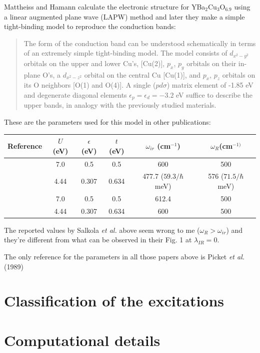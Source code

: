 Mattheiss and Hamann\cite{Mattheiss1987} calculate the electronic structure for YBa$_{2}$Cu$_{3}$O$_{6.9}$ using a linear augmented plane wave (LAPW) method and later they make a simple tight-binding model to reproduce the conduction bands:

\begin{quote}The form of the conduction band can be understood schematically in terms of an extremely simple tight-binding model. The model consists of $d_{x^2-y^2}$ orbitals on the upper and lower Cu's, [Cu(2)], $p_x$, $p_y$ orbitals on their in-plane O's, a $d_{x^2-z^2}$ orbital on the central Cu [Cu(1)], and $p_x$, $p_z$ orbitals on its O neighbors [O(1) and O(4)]. A single ($pd\sigma$) matrix element of -1.85 eV and degenerate diagonal elements $\epsilon_p = \epsilon_d=-3.2$ eV suffice to describe the upper bands, in analogy with the previously studied materials.
\end{quote}

These are the parameters used for this model in other publications:

\noindent\begin{tabular}{| l | c | c | c | c | c |}
\hline
Reference & $U$ (eV) & $\epsilon$ (eV) & $t$ (eV) & $\omega_{ir}$ (cm$^{-1}$) & $\omega_R$(cm$^{-1)}$ \\
\hline
\cite{MustredeLeon1992} & 7.0 & 0.5 & 0.5 & 600 & 500 \\ 
\cite{Salkola1994, Salkola1995} & 4.44 & 0.307 & 0.634 & 477.7 ($59.3/\hbar$ meV) & 576 ($71.5/\hbar$ meV) \\
\cite{DeLeon1999, Mena2006, Leon2008, MirandaMena2007} & 7.0 & 0.5 & 0.5 & 612.4 & 500 \\ 
\cite{MustredeLeon2000} & 4.44 & 0.307 & 0.634 & 600 & 500 \\
\hline
\end{tabular}

The reported values by Salkola \textit{et al.}\cite{Salkola1994} \cite{Salkola1995} above seem wrong to me ($\omega_R > \omega_{ir}$) and they're different from what can be observed in their Fig. 1 at $\lambda_{IR}=0$.

The only reference for the parameters in all those papers above is Picket \textit{et al.} (1989)

\section{Classification of the excitations}
\label{sec:classification}


\section{Computational details}
\label{sec:comp_details}

